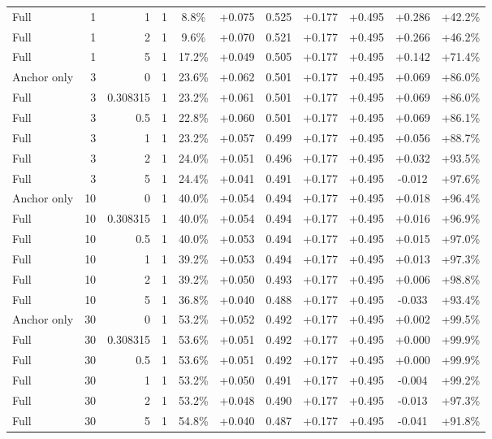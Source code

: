 \begin{table}[htbp]
\begin{tabular}{lrrrccccccc}
Full & 1 & 1 & 1 & 8.8\% & +0.075 & 0.525 & +0.177 & +0.495 & +0.286 & +42.2\% \\
Full & 1 & 2 & 1 & 9.6\% & +0.070 & 0.521 & +0.177 & +0.495 & +0.266 & +46.2\% \\
Full & 1 & 5 & 1 & 17.2\% & +0.049 & 0.505 & +0.177 & +0.495 & +0.142 & +71.4\% \\
Anchor only & 3 & 0 & 1 & 23.6\% & +0.062 & 0.501 & +0.177 & +0.495 & +0.069 & +86.0\% \\
Full & 3 & 0.308315 & 1 & 23.2\% & +0.061 & 0.501 & +0.177 & +0.495 & +0.069 & +86.0\% \\
Full & 3 & 0.5 & 1 & 22.8\% & +0.060 & 0.501 & +0.177 & +0.495 & +0.069 & +86.1\% \\
Full & 3 & 1 & 1 & 23.2\% & +0.057 & 0.499 & +0.177 & +0.495 & +0.056 & +88.7\% \\
Full & 3 & 2 & 1 & 24.0\% & +0.051 & 0.496 & +0.177 & +0.495 & +0.032 & +93.5\% \\
Full & 3 & 5 & 1 & 24.4\% & +0.041 & 0.491 & +0.177 & +0.495 & -0.012 & +97.6\% \\
Anchor only & 10 & 0 & 1 & 40.0\% & +0.054 & 0.494 & +0.177 & +0.495 & +0.018 & +96.4\% \\
Full & 10 & 0.308315 & 1 & 40.0\% & +0.054 & 0.494 & +0.177 & +0.495 & +0.016 & +96.9\% \\
Full & 10 & 0.5 & 1 & 40.0\% & +0.053 & 0.494 & +0.177 & +0.495 & +0.015 & +97.0\% \\
Full & 10 & 1 & 1 & 39.2\% & +0.053 & 0.494 & +0.177 & +0.495 & +0.013 & +97.3\% \\
Full & 10 & 2 & 1 & 39.2\% & +0.050 & 0.493 & +0.177 & +0.495 & +0.006 & +98.8\% \\
Full & 10 & 5 & 1 & 36.8\% & +0.040 & 0.488 & +0.177 & +0.495 & -0.033 & +93.4\% \\
Anchor only & 30 & 0 & 1 & 53.2\% & +0.052 & 0.492 & +0.177 & +0.495 & +0.002 & +99.5\% \\
Full & 30 & 0.308315 & 1 & 53.6\% & +0.051 & 0.492 & +0.177 & +0.495 & +0.000 & +99.9\% \\
Full & 30 & 0.5 & 1 & 53.6\% & +0.051 & 0.492 & +0.177 & +0.495 & +0.000 & +99.9\% \\
Full & 30 & 1 & 1 & 53.2\% & +0.050 & 0.491 & +0.177 & +0.495 & -0.004 & +99.2\% \\
Full & 30 & 2 & 1 & 53.2\% & +0.048 & 0.490 & +0.177 & +0.495 & -0.013 & +97.3\% \\
Full & 30 & 5 & 1 & 54.8\% & +0.040 & 0.487 & +0.177 & +0.495 & -0.041 & +91.8\% \\

\end{tabular}
\end{table}
